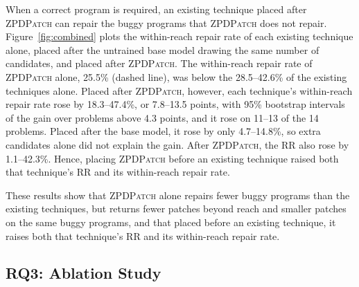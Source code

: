 \documentclass[conference]{IEEEtran}
\begin{document}
When a correct program is required, an existing technique placed after \textsc{ZPDPatch} can repair the buggy programs that \textsc{ZPDPatch} does not repair. Figure~\ref{fig:combined} plots the within-reach repair rate of each existing technique alone, placed after the untrained base model drawing the same number of candidates, and placed after \textsc{ZPDPatch}. The within-reach repair rate of \textsc{ZPDPatch} alone, 25.5\% (dashed line), was below the 28.5--42.6\% of the existing techniques alone. Placed after \textsc{ZPDPatch}, however, each technique's within-reach repair rate rose by 18.3--47.4\%, or 7.8--13.5 points, with 95\% bootstrap intervals of the gain over problems above 4.3 points, and it rose on 11--13 of the 14 problems. Placed after the base model, it rose by only 4.7--14.8\%, so extra candidates alone did not explain the gain. After \textsc{ZPDPatch}, the RR also rose by 1.1--42.3\%. Hence, placing \textsc{ZPDPatch} before an existing technique raised both that technique's RR and its within-reach repair rate.

These results show that \textsc{ZPDPatch} alone repairs fewer buggy programs than the existing techniques, but returns fewer patches beyond reach and smaller patches on the same buggy programs, and that placed before an existing technique, it raises both that technique's RR and its within-reach repair rate.

\subsection{RQ3: Ablation Study}
\label{sec:rq-ablation}
\end{document}
